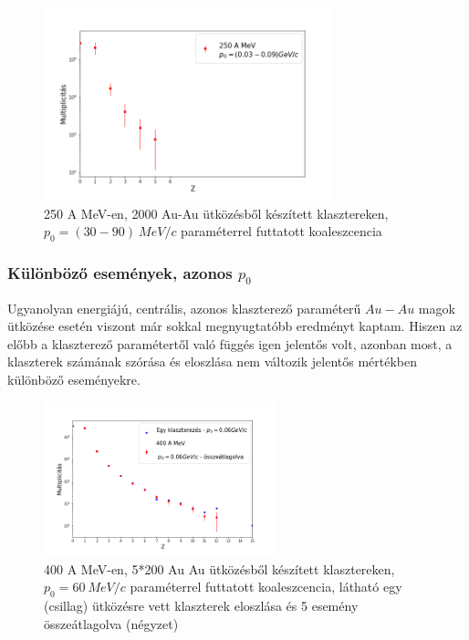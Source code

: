 \documentclass[a4paper,12pt]{article}
\begin{document}
\vspace{5mm}

\begin{figure}[!htb]
\centering
\includegraphics[width=0.75\textwidth]{./p0valtozik_klaszterek.png}
\caption{250 A MeV-en, 2000 Au-Au ütközésből készített klasztereken, $p_{0} = (30 - 90) ~MeV/c$ paraméterrel futtatott koaleszcencia}
\end{figure}

\vspace{5mm}

\subsubsection{ Különböző események, azonos $p_{0}$}

\vspace{5mm}

\par Ugyanolyan energiájú, centrális, azonos klaszterező paraméterű $Au-Au$ magok ütközése esetén viszont már sokkal megnyugtatóbb eredményt kaptam. Hiszen az előbb a klaszterező paramétertől való függés igen jelentős volt, azonban most, a klaszterek számának szórása és eloszlása nem változik jelentős mértékben különböző eseményekre. 

\vspace{5mm}

\begin{figure}[!htb]
\centering
\includegraphics[width=0.6\textwidth]{./p0allando_kulonbozoRandom.png}
\caption{400 A MeV-en, 5*200 Au Au ütközésből készített klasztereken, $p_{0} = 60 ~MeV/c$ paraméterrel futtatott koaleszcencia, látható egy (csillag) ütközésre vett klaszterek eloszlása és 5 esemény összeátlagolva (négyzet)}
\end{figure}
\end{document}
